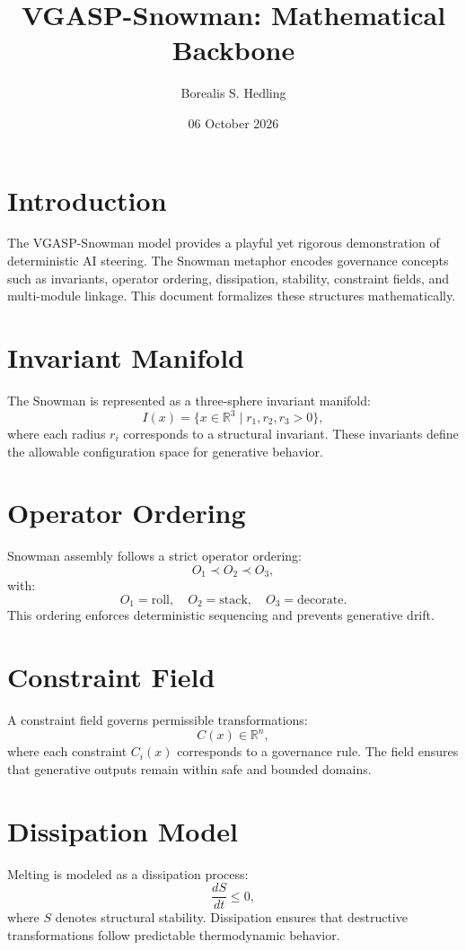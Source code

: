 \documentclass{article}
\title{VGASP-Snowman: Mathematical Backbone}
\author{Borealis S. Hedling}
\date{06 October 2026}
\begin{document}
\maketitle

\section{Introduction}
The VGASP-Snowman model provides a playful yet rigorous demonstration of
deterministic AI steering. The Snowman metaphor encodes governance concepts
such as invariants, operator ordering, dissipation, stability, constraint
fields, and multi-module linkage. This document formalizes these structures
mathematically.

\section{Invariant Manifold}
The Snowman is represented as a three-sphere invariant manifold:
\[
I(x) = \{ x \in \mathbb{R}^3 \mid r_1, r_2, r_3 > 0 \},
\]
where each radius \( r_i \) corresponds to a structural invariant. These
invariants define the allowable configuration space for generative behavior.

\section{Operator Ordering}
Snowman assembly follows a strict operator ordering:
\[
O_1 \prec O_2 \prec O_3,
\]
with:
\[
O_1 = \text{roll}, \quad
O_2 = \text{stack}, \quad
O_3 = \text{decorate}.
\]
This ordering enforces deterministic sequencing and prevents generative drift.

\section{Constraint Field}
A constraint field governs permissible transformations:
\[
C(x) \in \mathbb{R}^n,
\]
where each constraint \( C_i(x) \) corresponds to a governance rule. The field
ensures that generative outputs remain within safe and bounded domains.

\section{Dissipation Model}
Melting is modeled as a dissipation process:
\[
\frac{dS}{dt} \le 0,
\]
where \( S \) denotes structural stability. Dissipation ensures that destructive
transformations follow predictable thermodynamic behavior.
\end{document}

